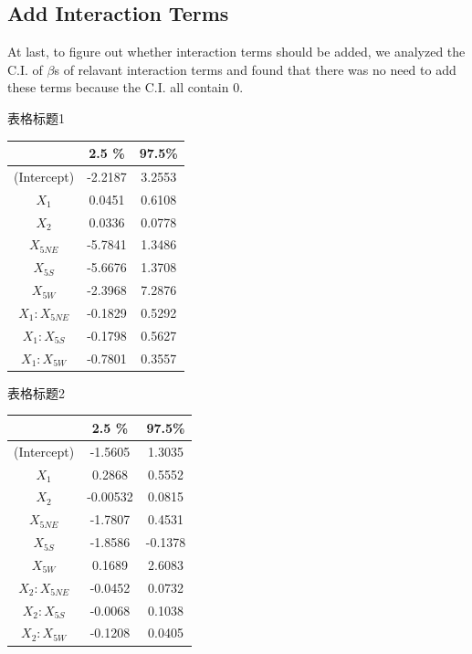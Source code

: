 \documentclass[a4paper,11pt,onecolumn,twoside]{article}
\begin{document}
\subsection{Add Interaction Terms}
At last, to figure out whether interaction terms should be added, we analyzed the C.I. of $\beta$s of relavant interaction terms and found that there was no need to add these terms because the C.I. all contain 0.
\begin{minipage}{\textwidth}
	\begin{minipage}[t]{0.45\textwidth}
		\centering
		\makeatletter{}\makeatother\caption{表格标题1}
		\begin{tabular}{ccc}
		\midrule[1.5pt]	
		&2.5 \% &97.5\% \\
		\hline    
		(Intercept) &-2.2187 &3.2553\\
		$X_1$           &0.0451 &0.6108\\
		$X_2$           &0.0336 &0.0778\\
		$X_{5NE}$        &-5.7841 &1.3486\\
		$X_{5S}$         &-5.6676 &1.3708\\
		$X_{5W}$         &-2.3968 &7.2876\\
		$X_1:X_{5NE}$     &-0.1829 &0.5292\\
		$X_1:X_{5S}$      &-0.1798 &0.5627\\
		$X_1:X_{5W}$      &-0.7801 &0.3557\\
		\midrule[1.5pt]
	   \end{tabular}
	\end{minipage}
	\begin{minipage}[t]{0.45\textwidth}
		\centering
		\makeatletter{}\makeatother\caption{表格标题2}
		\begin{tabular}{ccc}
			\midrule[1.5pt]	
			&2.5 \% &97.5\% \\
			\hline    
			(Intercept) &-1.5605  &1.3035\\
			$X_1$          &0.2868  &0.5552\\
			$X_2$          &-0.00532  &0.0815\\
			$X_{5NE}$        &-1.7807  &0.4531\\
			$X_{5S}$         &-1.8586 &-0.1378\\
			$X_{5W}$        & 0.1689  &2.6083\\
			$X_2:X_{5NE}$     &-0.0452  &0.0732\\
			$X_2:X_{5S}$      &-0.0068 &0.1038\\
			$X_2:X_{5W}$      &-0.1208  &0.0405\\
			\midrule[1.5pt]
		\end{tabular}
	\end{minipage}
\end{minipage}
\end{document}
